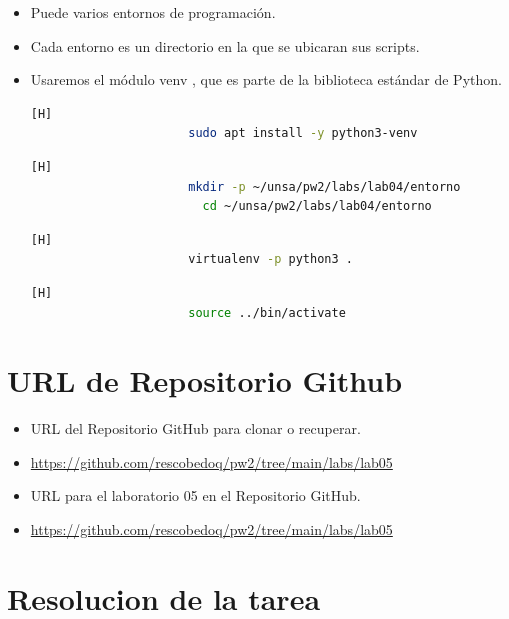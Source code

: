 \documentclass{article}
\begin{document}
\begin{itemize}
\begin{itemize}
\begin{itemize}
\begin{itemize}
                \item Puede varios entornos de programación.
                \item Cada entorno es un directorio en la que se ubicaran sus scripts.
                \item Usaremos el módulo venv , que es parte de la biblioteca estándar de Python.
                \begin{lstlisting}[language=bash,caption={Entorno de Linux-Instalemos venv escribiendo:}][H]
    		          sudo apt install -y python3-venv
    	        \end{lstlisting}
                \begin{lstlisting}[language=bash,caption={Entorno de Linux-Para crear un ambiente elija en qué directorio.}][H]
    		          mkdir -p ~/unsa/pw2/labs/lab04/entorno
                        cd ~/unsa/pw2/labs/lab04/entorno
    	        \end{lstlisting}
                \begin{lstlisting}[language=bash,caption={Entorno de Linux-En el directorio crea un entorno virtual ejecutando el siguiente comando:}][H]
    		          virtualenv -p python3 .
    	        \end{lstlisting}
                \begin{lstlisting}[language=bash,caption={Entorno de Linux-Ejecute el script de activación para activar el entorno virtual:}][H]
    		          source ../bin/activate
    	        \end{lstlisting}
            \end{itemize}
        \end{itemize}
	\end{itemize}
	
	\section{URL de Repositorio Github}
	\begin{itemize}
		\item URL del Repositorio GitHub para clonar o recuperar.
		\item \url{https://github.com/rescobedoq/pw2/tree/main/labs/lab05}
		\item URL para el laboratorio 05 en el Repositorio GitHub.
		\item \url{https://github.com/rescobedoq/pw2/tree/main/labs/lab05}
	\end{itemize}
	
	\section{Resolucion de la tarea}

\end{itemize}
\end{document}
